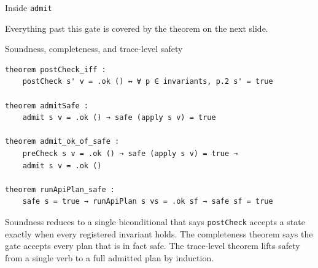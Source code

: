 \documentclass[10pt,aspectratio=169]{beamer}
\begin{document}
\begin{frame}{Inside \texttt{admit}}
\centering
{}
\centerline{\small Everything past this gate is covered by the theorem on the next slide.}
\end{frame}

\begin{frame}[fragile]{Soundness, completeness, and trace-level safety}
\begin{lstlisting}
theorem postCheck_iff :
    postCheck s' v = .ok () ↔ ∀ p ∈ invariants, p.2 s' = true

theorem admitSafe :
    admit s v = .ok () → safe (apply s v) = true

theorem admit_ok_of_safe :
    preCheck s v = .ok () → safe (apply s v) = true →
    admit s v = .ok ()

theorem runApiPlan_safe :
    safe s = true → runApiPlan s vs = .ok sf → safe sf = true
\end{lstlisting}
\vspace{0.4em}
\small Soundness reduces to a single biconditional that says \texttt{postCheck} accepts a state exactly when every registered invariant holds. The completeness theorem says the gate accepts every plan that is in fact safe. The trace-level theorem lifts safety from a single verb to a full admitted plan by induction.
\end{frame}
\end{document}
